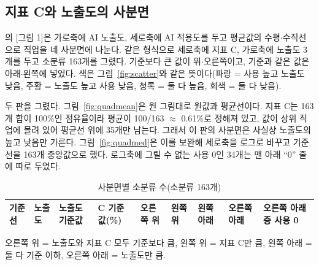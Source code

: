 \documentclass[11pt]{article}
\begin{document}
\subsection{지표 C와 노출도의 사분면}

\textcite{cheon-2025-ai-exposure-vs-ai-adoption}의 [그림 1]은 가로축에 AI 노출도, 세로축에 AI 적용도를 두고 평균값의 수평$\cdot$수직선으로 직업을 네 사분면에 나눈다. 같은 형식으로 세로축에 지표 C, 가로축에 노출도 3개를 두고 소분류 163개를 그렸다. 기준보다 큰 값이 위$\cdot$오른쪽이고, 기준과 같은 값은 아래$\cdot$왼쪽에 넣었다. 색은 그림~\ref{fig:scatter}와 같은 뜻이다(파랑 = 사용 높고 노출도 낮음, 주황 = 노출도 높고 사용 낮음, 청록 = 둘 다 높음, 회색 = 둘 다 낮음).

두 판을 그렸다. 그림~\ref{fig:quadmean}은 원 그림대로 원값과 평균선이다. 지표 C는 163개 합이 100\%인 점유율이라 평균이 100/163 $\approx$ 0.61\%로 정해져 있고, 값이 상위 직업에 몰려 있어 평균선 위에 35개만 남는다. 그래서 이 판의 사분면은 사실상 노출도의 높고 낮음만 가른다. 그림~\ref{fig:quadmed}은 이를 보완해 세로축을 로그로 바꾸고 기준선을 163개 중앙값으로 했다. 로그축에 그릴 수 없는 사용 0인 34개는 맨 아래 ``0'' 줄에 따로 두었다.

\begin{small}
\begin{longtable}{L{1.3cm}L{3.0cm}R{1.3cm}R{1.4cm}R{1.3cm}R{1.3cm}R{1.3cm}R{1.4cm}R{1.8cm}}
\caption{사분면별 소분류 수(소분류 163개)}\label{tab:quad}\\
\toprule
기준선 & 노출도 & 노출도 기준값 & C 기준값(\%) & 오른쪽 위 & 왼쪽 위 & 왼쪽 아래 & 오른쪽 아래 & 오른쪽 아래 중 사용 0 \\
\midrule
\endfirsthead

\bottomrule
\end{longtable}
\end{small}
\noindent 오른쪽 위 = 노출도와 지표 C 모두 기준보다 큼, 왼쪽 위 = 지표 C만 큼, 왼쪽 아래 = 둘 다 기준 이하, 오른쪽 아래 = 노출도만 큼.
\end{document}
